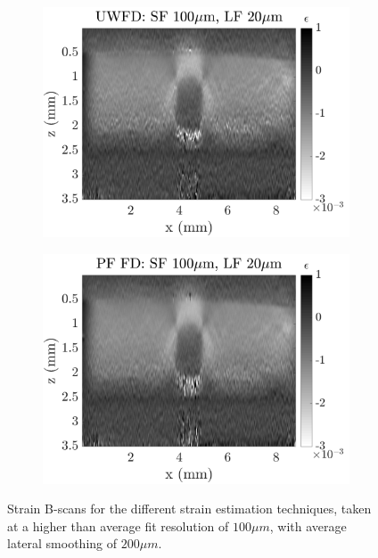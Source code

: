 \begin{figure}[h]
\begin{subfigure}{0.49\textwidth}
        \includegraphics[width=\textwidth]{appendix_figs/uwfd_fr100_lr20.png}
    \end{subfigure}
    \begin{subfigure}{0.49\textwidth}
    	\centering
        \includegraphics[width=\textwidth]{appendix_figs/pffd_fr100_lr20.png}
    \end{subfigure}    
    \caption{Strain B-scans for the different strain estimation techniques, taken at a higher than average fit resolution of $100\mu m$, with average lateral smoothing of $200\mu m$.}
	    \label{fr100_lr0}
\end{figure}


